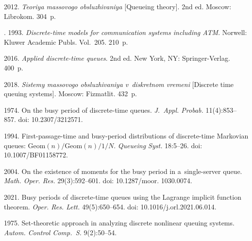 


  \begin{multicols}{2}

\renewcommand{\bibname}{\protect\rmfamily References}

{\small\frenchspacing
 {%
 \begin{thebibliography}{99}


 2012.
\textit{Teoriya massovogo obsluzhivaniya} [Queueing theory]. 2nd ed.
Moscow: Librokom. 304~p.

. 1993.
\textit{Discrete-time models for communication systems including ATM}. 
Norwell: Kluwer Academic Publs. Vol.~205. 210~p.
 

 2016. 
\textit{Applied discrete-time queues}. 2nd ed. 
New York, NY: Springer-Verlag. 400~p.

 2018. 
\textit{Sistemy massovogo obsluzhivaniya v~diskretnom vremeni} [Discrete time queuing systems]. 
Moscow: Fizmatlit. 432~p.


 1974.
On the busy period of discrete-time queues. 
\textit{J.~Appl. Probab.} 11(4):853--857.
doi: 10.2307/3212571.

 1994.
First-passage-time and busy-period distributions of discrete-time Markovian queues: $\mathrm{Geom}(n)/\mathrm{Geom}(n)/1/N$. 
\textit{Queueing Syst.} 18:5--26. 
doi: 10.1007/BF01158772.

 2004. 
On the existence of moments for the busy period in a~single-server queue. 
\textit{Math. Oper. Res.} 29(3):592--601. doi: 10.1287/moor. 1030.0074.

 2021. 
Busy periods of discrete-time queues using the Lagrange implicit function theorem. 
\textit{Oper. Res. Lett.} 49(5):650--654. doi: 10.1016/j.orl.2021.06.014.

 1975.
Set-theoretic approach in analyzing discrete nonlinear queuing systems.
\textit{Autom. Control  Comp.~S.} 9(2):50--54.
    

\end{thebibliography}}}
\end{multicols}
